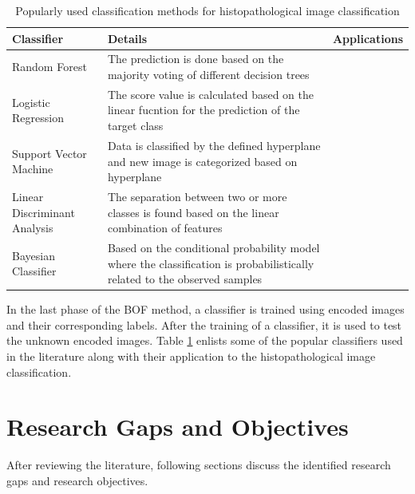 \begin{table}[ht!]
\renewcommand{\arraystretch}{1.3}
\caption[Popularly used classification methods for histopathological image classification]{Popularly used classification methods for histopathological image classification}
\label{ch2:Tab:classification}
\centering
\footnotesize{
\begin{tabular}{p{3.5cm}|p{8.5cm}|p{2.5cm}}
            \hline
              \textbf{Classifier}& \textbf{Details} &  \textbf{Applications} \\
             \hline
            Random Forest &  The prediction is done based on the majority voting of different decision trees  &  \cite{spanhol2016} \cite{sommer2012learning} \cite{Cruz-Roa2014}\\
            Logistic Regression  &  The score value is calculated based on the linear fucntion for the prediction of the target class & \cite{xu2016} \cite{hou2016} \cite{Wang2014a}     \\
      
            Support Vector Machine &  Data is classified by the defined hyperplane and new image is categorized based on hyperplane & \cite{Wang2016} \cite{Zhang2015} \cite{doyle2008}   \\
            
            Linear Discriminant Analysis & The separation between two or more classes is found based on the linear combination of features & \cite{Sertel2008} \cite{Sertel2008a} \cite{Esgiar1998}     \\
            
            Bayesian Classifier &  Based on the conditional probability model where the classification is  probabilistically related to the observed samples  & \cite{Huang2009} \cite{Zhou2015} \cite{Naik2008} \cite{Doyle2012} \\
            \hline
        \end{tabular}
}
\end{table}
In the last phase of the BOF method, a classifier is trained using encoded images and their corresponding labels. After the training of a classifier, it is used to test the unknown encoded images.  Table \ref{ch2:Tab:classification} enlists some of the popular classifiers used in the literature \cite{gurcan2009} along with their application to the histopathological image classification.


\section{Research Gaps and Objectives}
After reviewing the literature, following sections discuss the identified research gaps and research
objectives.
